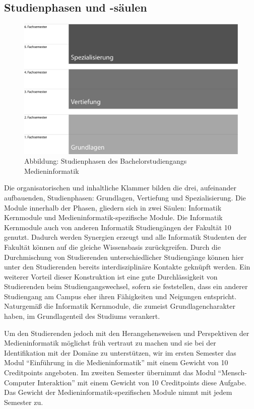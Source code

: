\subsection{Studienphasen und
-säulen}\label{studienphasen-und--suxe4ulen}

\begin{figure}[htbp]
\centering
\includegraphics[width=\columnwidth]{../anhaenge/bilder/ba-studienphasen.pdf}
\caption{Abbildung: Studienphasen des Bachelorstudiengangs
Medieninformatik}
\end{figure}

Die organisatorischen und inhaltliche Klammer bilden die drei,
aufeinander aufbauenden, Studienphasen: Grundlagen, Vertiefung und
Spezialisierung. Die Module innerhalb der Phasen, gliedern sich in zwei
Säulen: Informatik Kernmodule und Medieninformatik-spezifische Module.
Die Informatik Kernmodule auch von anderen Informatik Studiengängen der
Fakultät 10 genutzt. Dadurch werden Synergien erzeugt und alle
Informatik Studenten der Fakultät können auf die gleiche Wissensbasis
zurückgreifen. Durch die Durchmischung von Studierenden
unterschiedlicher Studiengänge können hier unter den Studierenden
bereits interdisziplinäre Kontakte geknüpft werden. Ein weiterer Vorteil
dieser Konstruktion ist eine gute Durchlässigkeit von Studierenden beim
Studiengangswechsel, sofern sie feststellen, dass ein anderer
Studiengang am Campus eher ihren Fähigkeiten und Neigungen entspricht.
Naturgemäß die Informatik Kernmodule, die zumeist Grundlagencharakter
haben, im Grundlagenteil des Studiums verankert.

Um den Studierenden jedoch mit den Herangehensweisen und Perspektiven
der Medieninformatik möglichst früh vertraut zu machen und sie bei der
Identifikation mit der Domäne zu unterstützen, wir im ersten Semester
das Modul ``Einführung in die Medieninformatik'' mit einem Gewicht von
10 Creditpoints angeboten. Im zweiten Semester übernimmt das Modul
``Mensch-Computer Interaktion'' mit einem Gewicht von 10 Creditpoints
diese Aufgabe. Das Gewicht der Medieninformatik-spezifischen Module
nimmt mit jedem Semester zu.

